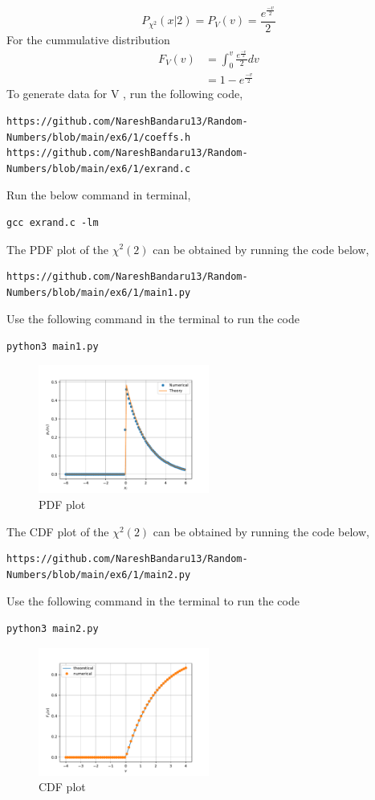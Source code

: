 \documentclass[journal,12pt,twocolumn]{IEEEtran}
\renewcommand\thesection{\arabic{section}}
\begin{document}
\begin{enumerate}[label=\thesection.\arabic*
,ref=\thesection.\theenumi]
$$P_{\chi^{2}} (x|2) = P_{V}(v)= \frac{ e^{\frac{-v}{2}}}{2} $$
For the cummulative distribution
\begin{align*}
F_{V}(v)&=\int_{0}^{v} \frac{ e^{\frac{-v}{2}}}{2} dv\\
&=1-e^{\frac{-v}{2}}
\label{eq:eq6}
\end{align*}
To generate data for V , run the following code,
\begin{lstlisting}
https://github.com/NareshBandaru13/Random-Numbers/blob/main/ex6/1/coeffs.h
https://github.com/NareshBandaru13/Random-Numbers/blob/main/ex6/1/exrand.c
\end{lstlisting}
Run the below command in terminal,
\begin{lstlisting}
gcc exrand.c -lm
\end{lstlisting}
The PDF plot of the $\chi^{2} (2)$ can be obtained by running the code below,
\begin{lstlisting}
https://github.com/NareshBandaru13/Random-Numbers/blob/main/ex6/1/main1.py
\end{lstlisting}
Use the following command in the terminal to run the code
\begin{lstlisting}
python3 main1.py
\end{lstlisting}
\begin{figure}[H]
\includegraphics[width=0.5\textwidth]{v.pdf}
\caption{PDF plot}
\label{fig:chi_PDF}
\end{figure}
The CDF plot of the $\chi^{2} (2)$ can be obtained by running the code below,
\begin{lstlisting}
https://github.com/NareshBandaru13/Random-Numbers/blob/main/ex6/1/main2.py
\end{lstlisting}
Use the following command in the terminal to run the code
\begin{lstlisting}
python3 main2.py
\end{lstlisting}
\begin{figure}[H]
\includegraphics[width=0.5\textwidth]{v_cdf.pdf}
\caption{CDF plot}
\label{fig:chi_cdf}
\end{figure}




\end{enumerate}
\end{document}
